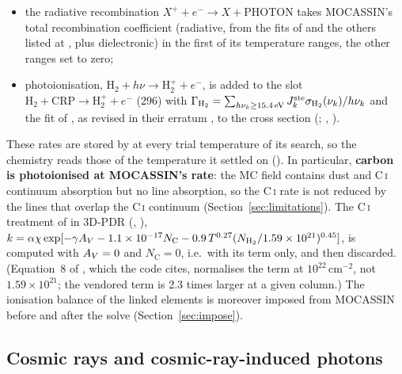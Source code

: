 \begin{itemize}
  attributes the formula to \citet{DrakeUlrich1980}; that paper takes its
  collisional ionisation rates from \citet{Johnson1972} and tabulates
  $4.88\times10^{-16}$\,cm$^3$\,s$^{-1}$ for the ground level at $10^4$\,K (their
  Table~3), so the formula's origin is not established
  (Section~\ref{sec:limitations});
\item the radiative recombination $X^++e^-\to X+\mathrm{PHOTON}$ takes
  MOCASSIN's total recombination coefficient (radiative, from the fits of
  \citealt{VernerFerland1996} and the others listed at
  , plus dielectronic) in the first of its
  temperature ranges, the other ranges set to zero;
\item \Htwo{} photoionisation, $\mathrm{H_2}+h\nu\to\mathrm{H_2^+}+e^-$, is
  added to the slot $\mathrm{H_2}+\mathrm{CRP}\to\mathrm{H_2^+}+e^-$ (296) with
  $\Gamma_{\mathrm{H_2}}=\sum_{h\nu_k\ge15.4\,\mathrm{eV}}J^{\mathrm{ste}}_k\sigma_{\mathrm{H_2}}(\nu_k)/h\nu_k$
  and the fit of \citet{Yan1998}, as revised in their erratum \citep{Yan2001},
  to the cross section (; ,
  ).
\end{itemize}
These rates are stored by  at every trial temperature of its
search, so the chemistry reads those of the temperature it settled on
(). In particular, \textbf{carbon is
photoionised at MOCASSIN's rate}: the MC field contains dust and C\,\textsc{i}
continuum absorption but no \Htwo{} line absorption, so the C\,\textsc{i} rate is
not reduced by the \Htwo{} lines that overlap the C\,\textsc{i} continuum
(Section~\ref{sec:limitations}). The C\,\textsc{i} treatment of
\citet{KampBertoldi2000} in 3D-PDR (,
),
$k=\alpha\chi\exp[-\gamma A_{V}-1.1\times10^{-17}N_{\mathrm C}-0.9\,T^{0.27}(N_{\mathrm{H_2}}/1.59\times10^{21})^{0.45}]$,
is computed with $A_{V}=0$ and $N_{\mathrm C}=0$, i.e.\ with its \Htwo{} term only,
and then discarded. (Equation~8 of \citealt{KampBertoldi2000}, which the code
cites, normalises the \Htwo{} term at $10^{22}$\,cm$^{-2}$, not $1.59\times10^{21}$; the
vendored term is 2.3 times larger at a given column.) The ionisation balance of
the linked elements is moreover imposed from MOCASSIN before and after the
solve (Section~\ref{sec:impose}).

\subsection{Cosmic rays and cosmic-ray-induced photons}
\label{sec:cr}


